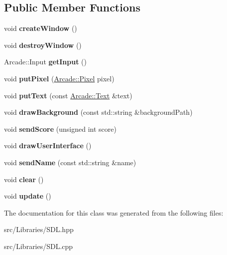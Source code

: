\subsection*{Public Member Functions}
\begin{DoxyCompactItemize}
\item 
\mbox{\label{class_arcade_1_1_s_d_l_aaef4833a806524b8fb81a69341099c62}} 
void {\bfseries create\+Window} ()
\item 
\mbox{\label{class_arcade_1_1_s_d_l_a54eecbeb527daffb86edb09b3116eba5}} 
void {\bfseries destroy\+Window} ()
\item 
\mbox{\label{class_arcade_1_1_s_d_l_a8e2b64e6963c2c52384954c74ef878dc}} 
Arcade\+::\+Input {\bfseries get\+Input} ()
\item 
\mbox{\label{class_arcade_1_1_s_d_l_a80f1de868a87158aedc416ed5af451c1}} 
void {\bfseries put\+Pixel} (\mbox{\hyperlink{struct_arcade_1_1_pixel}{Arcade\+::\+Pixel}} pixel)
\item 
\mbox{\label{class_arcade_1_1_s_d_l_acf96a58981b64e3a41ce1f0adeb65db1}} 
void {\bfseries put\+Text} (const \mbox{\hyperlink{struct_arcade_1_1_text}{Arcade\+::\+Text}} \&text)
\item 
\mbox{\label{class_arcade_1_1_s_d_l_af48b9e73bed971ac6b2713abe120c776}} 
void {\bfseries draw\+Background} (const std\+::string \&background\+Path)
\item 
\mbox{\label{class_arcade_1_1_s_d_l_a6e40941ec661b902aa80acb8fdbbcbf0}} 
void {\bfseries send\+Score} (unsigned int score)
\item 
\mbox{\label{class_arcade_1_1_s_d_l_aa3470e47c9bd7234ba2ccc4a900cfabe}} 
void {\bfseries draw\+User\+Interface} ()
\item 
\mbox{\label{class_arcade_1_1_s_d_l_ada2bee00a245d75e475103cef0e56c66}} 
void {\bfseries send\+Name} (const std\+::string \&name)
\item 
\mbox{\label{class_arcade_1_1_s_d_l_a8635ea8f90f6b70c1af4a550e225e742}} 
void {\bfseries clear} ()
\item 
\mbox{\label{class_arcade_1_1_s_d_l_abfceb1c90adb1111eba21c92144e18d2}} 
void {\bfseries update} ()
\end{DoxyCompactItemize}


The documentation for this class was generated from the following files\+:\begin{DoxyCompactItemize}
\item 
src/\+Libraries/S\+D\+L.\+hpp\item 
src/\+Libraries/S\+D\+L.\+cpp\end{DoxyCompactItemize}
